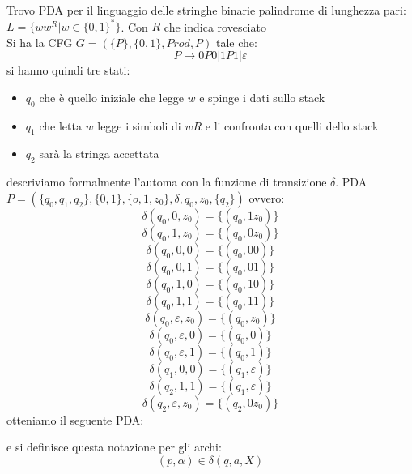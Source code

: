 \documentclass[a4paper,12pt, oneside]{book}
\begin{document}
\begin{esempio}
Trovo PDA per il linguaggio delle stringhe binarie  palindrome di lunghezza pari: $L=\{ww^R|w\in\{0,1\}^*\}$. Con $R$ che indica rovesciato\\
Si ha la CFG $G=(\{P\},\{0,1\},Prod,P)$ tale che:
$$P\to 0P0|1P1|\varepsilon$$
si hanno quindi tre stati:
\begin{itemize}
\item $q_0$ che è quello iniziale che legge $w$ e spinge i dati sullo stack
\item $q_1$ che letta $w$ legge i simboli di $wR$ e li confronta con quelli dello stack
\item $q_2$ sarà la stringa accettata
\end{itemize}
descriviamo formalmente l'automa con la funzione di transizione $\delta$.
PDA $P=(\{q_0,q_1,q_2\},\{0,1\}, \{o,1,z_0\},\delta,q_0,z_0,\{q_2\})$
ovvero:
$$\delta(q_0,0,z_0)=\{(q_0,1z_0)\}$$
$$\delta(q_0,1,z_0)=\{(q_0,0z_0)\}$$
$$\delta(q_0,0,0)=\{(q_0,00)\}$$
$$\delta(q_0,0,1)=\{(q_0,01)\}$$
$$\delta(q_0,1,0)=\{(q_0,10)\}$$
$$\delta(q_0,1,1)=\{(q_0,11)\}$$
$$\delta(q_0,\varepsilon,z_0)=\{(q_0,z_0)\}$$
$$\delta(q_0,\varepsilon,0)=\{(q_0,0)\}$$
$$\delta(q_0,\varepsilon,1)=\{(q_0,1)\}$$
$$\delta(q_1,0,0)=\{(q_1,\varepsilon)\}$$
$$\delta(q_2,1,1)=\{(q_1,\varepsilon)\}$$
$$\delta(q_2,\varepsilon,z_0)=\{(q_2,0z_0)\}$$
\newpage 
otteniamo il seguente PDA:
\begin{center}
\end{center}
e si definisce questa notazione per gli archi:
$$(p,\alpha)\in\delta(q,a,X)$$
\begin{center}
\end{center}
\end{esempio}
\end{document}
